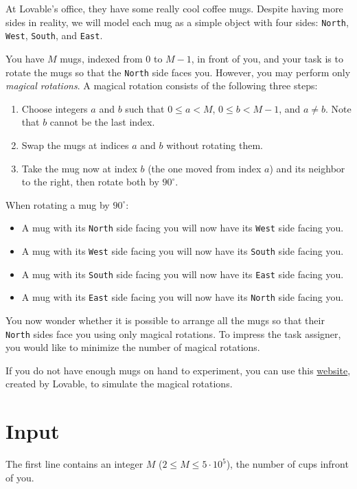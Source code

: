 

At Lovable's office, they have some really cool coffee mugs. 
Despite having more sides in reality, we will model each mug as a simple object with four sides: \texttt{North}, \texttt{West}, \texttt{South}, and \texttt{East}.

You have $M$ mugs, indexed from $0$ to $M-1$, in front of you, 
and your task is to rotate the mugs so that the \texttt{North} side faces you. 
However, you may perform only \emph{magical rotations}. 
A magical rotation consists of the following three steps:
\begin{enumerate}
  \item Choose integers $a$ and $b$ such that $0 \le a < M$, $0 \le b < M-1$, and $a \neq b$. Note that $b$ cannot be the last index.
  \item Swap the mugs at indices $a$ and $b$ without rotating them.
  \item Take the mug now at index $b$ (the one moved from index $a$) and its neighbor to the right, then rotate both by $90^\circ$.
\end{enumerate}

When rotating a mug by $90^\circ$:
\begin{itemize}
  \item A mug with its \texttt{North} side facing you will now have its \texttt{West} side facing you.
  \item A mug with its \texttt{West} side facing you will now have its \texttt{South} side facing you.
  \item A mug with its \texttt{South} side facing you will now have its \texttt{East} side facing you.
  \item A mug with its \texttt{East} side facing you will now have its \texttt{North} side facing you.
\end{itemize}

You now wonder whether it is possible to arrange all the mugs so that their \texttt{North} sides face you using only magical rotations. To impress the task assigner, you would like to minimize the number of magical rotations.

If you do not have enough mugs on hand to experiment, you can use this \href{https://rotatingmugs.lovable.app/}{website}, created by Lovable, to simulate the magical rotations.
\section*{Input}
The first line contains an integer $M$ ($2 \leq M \leq 5 \cdot 10^5$), the number of cups infront of you.

